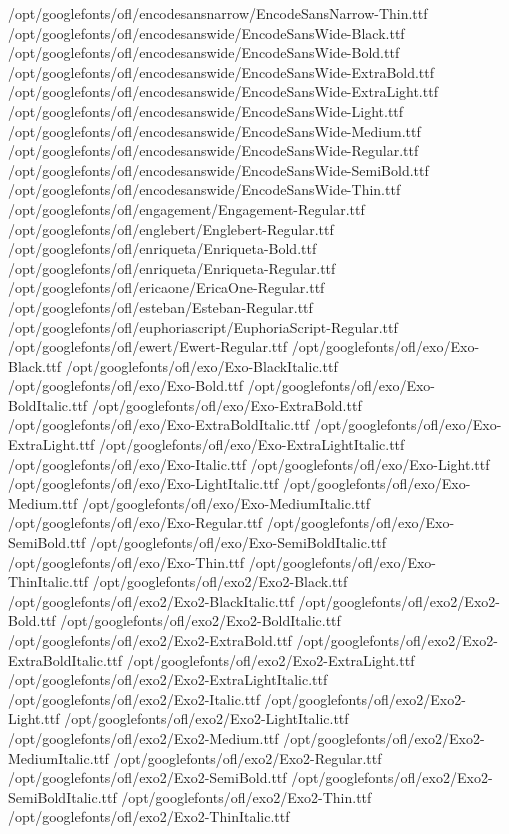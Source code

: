 /opt/googlefonts/ofl/encodesansnarrow/EncodeSansNarrow-Thin.ttf
/opt/googlefonts/ofl/encodesanswide/EncodeSansWide-Black.ttf
/opt/googlefonts/ofl/encodesanswide/EncodeSansWide-Bold.ttf
/opt/googlefonts/ofl/encodesanswide/EncodeSansWide-ExtraBold.ttf
/opt/googlefonts/ofl/encodesanswide/EncodeSansWide-ExtraLight.ttf
/opt/googlefonts/ofl/encodesanswide/EncodeSansWide-Light.ttf
/opt/googlefonts/ofl/encodesanswide/EncodeSansWide-Medium.ttf
/opt/googlefonts/ofl/encodesanswide/EncodeSansWide-Regular.ttf
/opt/googlefonts/ofl/encodesanswide/EncodeSansWide-SemiBold.ttf
/opt/googlefonts/ofl/encodesanswide/EncodeSansWide-Thin.ttf
/opt/googlefonts/ofl/engagement/Engagement-Regular.ttf
/opt/googlefonts/ofl/englebert/Englebert-Regular.ttf
/opt/googlefonts/ofl/enriqueta/Enriqueta-Bold.ttf
/opt/googlefonts/ofl/enriqueta/Enriqueta-Regular.ttf
/opt/googlefonts/ofl/ericaone/EricaOne-Regular.ttf
/opt/googlefonts/ofl/esteban/Esteban-Regular.ttf
/opt/googlefonts/ofl/euphoriascript/EuphoriaScript-Regular.ttf
/opt/googlefonts/ofl/ewert/Ewert-Regular.ttf
/opt/googlefonts/ofl/exo/Exo-Black.ttf
/opt/googlefonts/ofl/exo/Exo-BlackItalic.ttf
/opt/googlefonts/ofl/exo/Exo-Bold.ttf
/opt/googlefonts/ofl/exo/Exo-BoldItalic.ttf
/opt/googlefonts/ofl/exo/Exo-ExtraBold.ttf
/opt/googlefonts/ofl/exo/Exo-ExtraBoldItalic.ttf
/opt/googlefonts/ofl/exo/Exo-ExtraLight.ttf
/opt/googlefonts/ofl/exo/Exo-ExtraLightItalic.ttf
/opt/googlefonts/ofl/exo/Exo-Italic.ttf
/opt/googlefonts/ofl/exo/Exo-Light.ttf
/opt/googlefonts/ofl/exo/Exo-LightItalic.ttf
/opt/googlefonts/ofl/exo/Exo-Medium.ttf
/opt/googlefonts/ofl/exo/Exo-MediumItalic.ttf
/opt/googlefonts/ofl/exo/Exo-Regular.ttf
/opt/googlefonts/ofl/exo/Exo-SemiBold.ttf
/opt/googlefonts/ofl/exo/Exo-SemiBoldItalic.ttf
/opt/googlefonts/ofl/exo/Exo-Thin.ttf
/opt/googlefonts/ofl/exo/Exo-ThinItalic.ttf
/opt/googlefonts/ofl/exo2/Exo2-Black.ttf
/opt/googlefonts/ofl/exo2/Exo2-BlackItalic.ttf
/opt/googlefonts/ofl/exo2/Exo2-Bold.ttf
/opt/googlefonts/ofl/exo2/Exo2-BoldItalic.ttf
/opt/googlefonts/ofl/exo2/Exo2-ExtraBold.ttf
/opt/googlefonts/ofl/exo2/Exo2-ExtraBoldItalic.ttf
/opt/googlefonts/ofl/exo2/Exo2-ExtraLight.ttf
/opt/googlefonts/ofl/exo2/Exo2-ExtraLightItalic.ttf
/opt/googlefonts/ofl/exo2/Exo2-Italic.ttf
/opt/googlefonts/ofl/exo2/Exo2-Light.ttf
/opt/googlefonts/ofl/exo2/Exo2-LightItalic.ttf
/opt/googlefonts/ofl/exo2/Exo2-Medium.ttf
/opt/googlefonts/ofl/exo2/Exo2-MediumItalic.ttf
/opt/googlefonts/ofl/exo2/Exo2-Regular.ttf
/opt/googlefonts/ofl/exo2/Exo2-SemiBold.ttf
/opt/googlefonts/ofl/exo2/Exo2-SemiBoldItalic.ttf
/opt/googlefonts/ofl/exo2/Exo2-Thin.ttf
/opt/googlefonts/ofl/exo2/Exo2-ThinItalic.ttf
